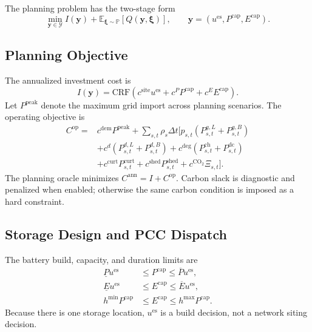 \documentclass[times]{elsarticle}
\begin{document}
The planning problem has the two-stage form
\begin{equation}
\min_{\bm y\in\mathcal Y} I(\bm y)+
\mathbb{E}_{\bm\xi\sim\mathbb{P}}[Q(\bm y,\bm\xi)],
\qquad
\bm y=(u^{\mathrm{es}},P^{\mathrm{cap}},E^{\mathrm{cap}}).
\label{eq:two_stage}
\end{equation}

\subsection{Planning Objective}

The annualized investment cost is
\begin{equation}
I(\bm y)=\mathrm{CRF}
\left(c^{\mathrm{site}}u^{\mathrm{es}}+c^P P^{\mathrm{cap}}
+c^E E^{\mathrm{cap}}\right).
\label{eq:investment}
\end{equation}
Let $P^{\mathrm{peak}}$ denote the maximum grid import across planning
scenarios. The operating objective is
\begin{align}
C^{\mathrm{op}}={}&c^{\mathrm{dem}}P^{\mathrm{peak}}
+\sum_{s,t}\rho_s\Delta t\big[
p_{s,t}(P^{g,L}_{s,t}+P^{g,B}_{s,t})
\nonumber\\
&+c^d(P^{d,L}_{s,t}+P^{d,B}_{s,t})
+c^{\mathrm{deg}}(P^{\mathrm{ch}}_{s,t}+P^{\mathrm{dc}}_{s,t})
\nonumber\\
&+c^{\mathrm{curt}}P^{\mathrm{curt}}_{s,t}
+c^{\mathrm{shed}}P^{\mathrm{shed}}_{s,t}
+c^{\mathrm{CO_2}}\Xi_{s,t}\big].
\label{eq:operating_cost}
\end{align}
The planning oracle minimizes $C^{\mathrm{ann}}=I+C^{\mathrm{op}}$.
Carbon slack is diagnostic and penalized when enabled; otherwise the same
carbon condition is imposed as a hard constraint.

\subsection{Storage Design and PCC Dispatch}

The battery build, capacity, and duration limits are
\begin{align}
\underline P u^{\mathrm{es}}&\le P^{\mathrm{cap}}\le\overline P u^{\mathrm{es}},
\label{eq:power_cap}\\
\underline E u^{\mathrm{es}}&\le E^{\mathrm{cap}}\le\overline E u^{\mathrm{es}},
\label{eq:energy_cap}\\
h^{\min}P^{\mathrm{cap}}&\le E^{\mathrm{cap}}\le h^{\max}P^{\mathrm{cap}}.
\label{eq:duration}
\end{align}
Because there is one storage location, $u^{\mathrm{es}}$ is a build decision,
not a network siting decision.
\end{document}
